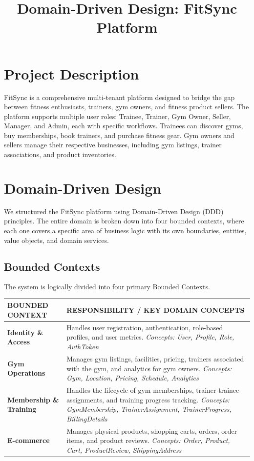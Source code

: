 \documentclass[11pt,a4paper]{article}
\title{Domain-Driven Design: FitSync Platform}
\author{}
\date{}
\begin{document}
\maketitle

\tableofcontents
\newpage

\section{Project Description}
FitSync is a comprehensive multi-tenant platform designed to bridge the gap between fitness enthusiasts, trainers, gym owners, and fitness product sellers. The platform supports multiple user roles: Trainee, Trainer, Gym Owner, Seller, Manager, and Admin, each with specific workflows. Trainees can discover gyms, buy memberships, book trainers, and purchase fitness gear. Gym owners and sellers manage their respective businesses, including gym listings, trainer associations, and product inventories.

\section{Domain-Driven Design}
We structured the FitSync platform using Domain-Driven Design (DDD) principles. The entire domain is broken down into four bounded contexts, where each one covers a specific area of business logic with its own boundaries, entities, value objects, and domain services.

\subsection{Bounded Contexts}
The system is logically divided into four primary Bounded Contexts.

\vspace{1em}
\noindent
\begin{tabularx}{\textwidth}{l X}
\toprule
\textbf{BOUNDED CONTEXT} & \textbf{RESPONSIBILITY / KEY DOMAIN CONCEPTS} \\
\midrule
\textbf{Identity \& Access} & Handles user registration, authentication, role-based profiles, and user metrics. \newline \textit{Concepts: User, Profile, Role, AuthToken} \\
\midrule
\textbf{Gym Operations} & Manages gym listings, facilities, pricing, trainers associated with the gym, and analytics for gym owners. \newline \textit{Concepts: Gym, Location, Pricing, Schedule, Analytics} \\
\midrule
\textbf{Membership \& Training} & Handles the lifecycle of gym memberships, trainer-trainee assignments, and training progress tracking. \newline \textit{Concepts: GymMembership, TrainerAssignment, TrainerProgress, BillingDetails} \\
\midrule
\textbf{E-commerce} & Manages physical products, shopping carts, orders, order items, and product reviews. \newline \textit{Concepts: Order, Product, Cart, ProductReview, ShippingAddress} \\
\bottomrule
\end{tabularx}
\end{document}
